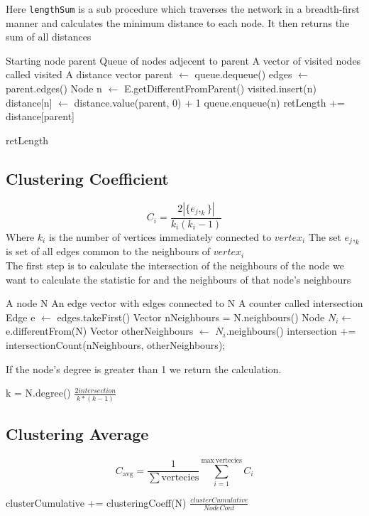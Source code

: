 \documentclass[a4paper,11pt,titlepage]{article}
\newcommand{\code}[1]{\texttt{#1}}
\begin{document}
Here \code{lengthSum} is a sub procedure which traverses the network in a
breadth-first manner and calculates the minimum distance to each node.
It then returns the sum of all distances

\begin{algorithmic}
\REQUIRE Starting node parent
\REQUIRE Queue of nodes adjecent to parent
\REQUIRE A vector of visited nodes called visited
\REQUIRE A distance vector
	\STATE parent $\gets$ queue.dequeue()
	\STATE edges $\gets$ parent.edges()
	\STATE Node n $\gets$ E.getDifferentFromParent()
			\STATE visited.insert(n)
			\STATE distance[n] $\gets$ distance.value(parent, 0) + 1
			\STATE queue.enqueue(n)
		\ENDIF
	\ENDFOR
	\STATE retLength += distance[parent]
\ENDWHILE

\RETURN retLength
\end{algorithmic}
\subsection{Clustering Coefficient}
\[
C_i = \frac{2|\{e_j,_k\}|}{k_i(k_i-1)}
\]
Where $k_i$ is the number of vertices immediately connected to $vertex_i$
\newline
The set ${e_j,_k}$ is set of all edges common to the neighbours of $vertex_i$\\

The first step is to calculate the intersection of the neighbours of the node we want to calculate the statistic for and the neighbours of that node's neighbours
\begin{algorithmic}
\REQUIRE A node N
\REQUIRE An edge vector with edges connected to N
\REQUIRE A counter called intersection
	\STATE Edge e $\gets$ edges.takeFirst()
	\STATE Vector nNeighbours = N.neighbours()
	\STATE Node $N_i \gets$ e.differentFrom(N)
	\STATE Vector otherNeighbours $\gets$  $N_i$.neighbours()
	\STATE  intersection += intersectionCount(nNeighbours, otherNeighbours);
\ENDWHILE
\end{algorithmic}
If the node's degree is greater than 1 we return the calculation.
\begin{algorithmic}
\REQUIRE k = N.degree()
	\RETURN $\frac{2intersection}{k*(k-1)}$
\ELSE
\ENDIF
\end{algorithmic}

\subsection{Clustering Average}
\[
C_\mathrm{avg} = \frac{1}{\mathrm{\sum vertecies}}\sum_{i=1}^{\mathrm{max\
vertecies}} C_i
\]
\begin{algorithmic}
	\STATE clusterCumulative += clusteringCoeff(N)
\ENDFOR
\RETURN $\frac{clusterCumulative}{Node Cont}$
\end{algorithmic}
\end{document}
